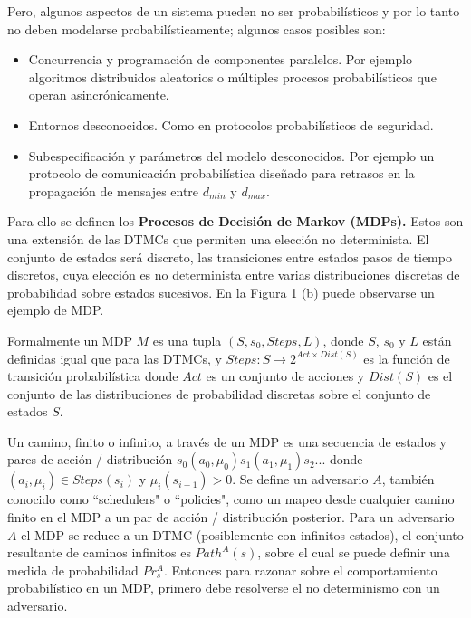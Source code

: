 \documentclass[11pt]{article}
\begin{document}
Pero, algunos aspectos de un sistema pueden no ser probabil\'isticos y por lo tanto no deben modelarse probabil\'isticamente; algunos casos posibles son:

\begin{itemize}
	\item Concurrencia y programaci\'on de componentes paralelos. Por ejemplo algoritmos distribuidos aleatorios o m\'ultiples procesos probabil\'isticos que operan asincr\'onicamente.
	
	\item Entornos desconocidos. Como en protocolos probabil\'isticos de seguridad. %
	
	\item Subespecificaci\'on y par\'ametros del modelo desconocidos. Por ejemplo un protocolo de comunicaci\'on probabil\'istica dise\~nado para retrasos en la propagaci\'on de mensajes entre $d_{min}$ y $d_{max}$.
	
\end{itemize}

Para ello se definen los \textbf{Procesos de Decisi\'on de Markov (MDPs).} Estos son una extensi\'on de las DTMCs que permiten una elecci\'on no determinista. El conjunto de estados ser\'a discreto, las transiciones entre estados pasos de tiempo discretos, cuya elecci\'on es no determinista entre varias distribuciones discretas de probabilidad sobre estados sucesivos. En la Figura 1 (b) puede observarse un ejemplo de MDP.

Formalmente un MDP $M$ es una tupla $(S, s_0, Steps, L)$, donde $S$, $s_0$ y $L$ est\'an definidas igual que para las DTMCs, y $Steps: S \rightarrow 2^{Act \times  Dist(S)}$ es la funci\'on de transici\'on probabil\'istica donde $Act$ es un conjunto de acciones y $Dist(S)$ es el conjunto de las distribuciones de probabilidad discretas sobre el conjunto de estados $S$.

Un camino, finito o infinito, a trav\'es de un MDP es una secuencia de estados y pares de acci\'on / distribuci\'on $s_0(a_0, \mu_0)s_1 (a_1, \mu_1)s_2...$ donde $(a_i, \mu_i) \in Steps(s_i)$ y $\mu_i(s_{i+1})>0$. %
Se define un adversario $A$, tambi\'en conocido como ``schedulers" o ``policies", como un mapeo desde cualquier camino finito en el MDP a un par de acci\'on / distribuci\'on posterior. Para un adversario $A$ el MDP se reduce a un DTMC (posiblemente con infinitos estados), el conjunto resultante de caminos infinitos es $Path^A(s)$, sobre el cual se puede definir una medida de probabilidad $Pr^A_s$. Entonces para razonar sobre el comportamiento probabil\'istico en un MDP, primero debe resolverse el no determinismo con un adversario. \\
\end{document}

